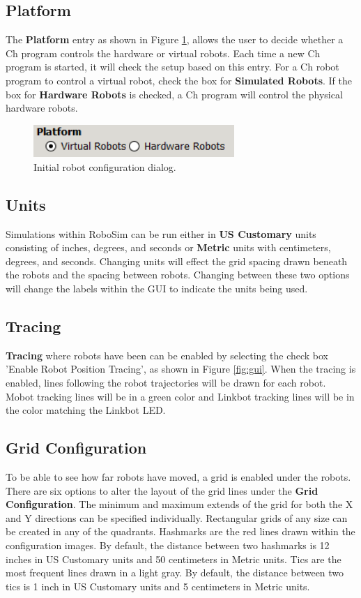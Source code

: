 \documentclass{article}
\begin{document}
\subsection{Platform}
The {\bf Platform} entry as shown in Figure \ref{fig:platform}, allows the user
to decide whether a Ch program controls the hardware or virtual robots.  Each
time a new Ch program is started, it will check the setup based on this entry.
For a Ch robot program to control a virtual robot, check the box for {\bf
Simulated Robots}.  If the box for {\bf Hardware Robots} is checked, a Ch
program will control the physical hardware robots.
\begin{figure}[H]
	\begin{center}
		\includegraphics[width=3in]{images/gui_platform}
	\end{center}
	\caption{Initial robot configuration dialog.}
	\label{fig:platform}
\end{figure}

\subsection{Units}
\label{sec:units}
Simulations within RoboSim can be run either in {\bf US Customary} units
consisting of inches, degrees, and seconds or {\bf Metric} units with
centimeters, degrees, and seconds.  Changing units will effect the grid spacing
drawn beneath the robots and the spacing between robots.  Changing between these
two options will change the labels within the GUI to indicate the units being
used.

\subsection{Tracing}
{\bf Tracing} where robots have been can be enabled by selecting the check box
'Enable Robot Position Tracing', as shown in Figure \ref{fig:gui}.  When the
tracing is enabled, lines following the robot trajectories will be drawn for
each robot.  Mobot tracking lines will be in a green color and Linkbot tracking
lines will be in the color matching the Linkbot LED.

\subsection{Grid Configuration}
To be able to see how far robots have moved, a grid is enabled under the robots.
There are six options to alter the layout of the grid lines under the {\bf Grid
Configuration}.  The minimum and maximum extends of the grid for both the X and
Y directions can be specified individually.  Rectangular grids of any size can
be created in any of the quadrants.  Hashmarks are the red lines drawn within
the configuration images.  By default, the distance between two hashmarks is 12
inches in US Customary units and 50 centimeters in Metric units.  Tics are the
most frequent lines drawn in a light gray.  By default, the distance between two
tics is 1 inch in US Customary units and 5 centimeters in Metric units.
\end{document}
